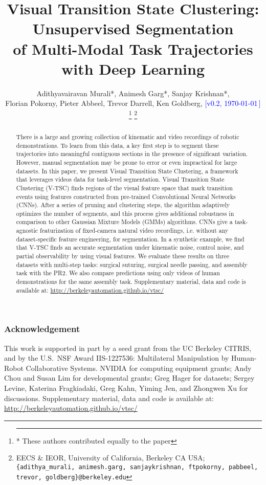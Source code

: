 \documentclass[letterpaper, 10 pt, conference]{ieeeconf}
\title{\LARGE \bf
Visual Transition State Clustering: Unsupervised Segmentation\\ of
Multi-Modal \del{Surgical}Task Trajectories with Deep Learning}
\author{%
Adithyavairavan Murali*, Animesh Garg*, Sanjay Krishnan*,\\ Florian Pokorny,
Pieter Abbeel, Trevor Darrell, Ken Goldberg, {\footnotesize \textcolor{blue}{[v0.2, \today\,\currenttime]}} 
\thanks{\hrule \vspace{5pt} * These authors contributed equally to the paper}%
\thanks{EECS \& IEOR, University of California, Berkeley CA USA; \texttt{\{adithya\_murali, animesh.garg, sanjaykrishnan, ftpokorny, pabbeel, trevor, goldberg\}@berkeley.edu}}%
}
\newcommand{\tsc}{V-TSC\xspace}
\begin{document}
\maketitle

\begin{abstract}
There is a large and growing collection of kinematic and video recordings of robotic demonstrations.
To learn from this data, a key first step is to segment these trajectories into meaningful contiguous sections in the presence of significant variation.  
However, manual segmentation may be prone to error or even impractical for large datasets.
In this paper, we present Visual Transition State Clustering, a framework that leverages videos data for task-level segmentation. Visual Transition State Clustering (\tsc) finds regions of the visual feature space that mark transition events using features constructed from pre-trained Convolutional Neural Networks (CNNs).
After a series of pruning and clustering steps, the algorithm adaptively optimizes the number of segments, and this process gives additional robustness in comparison to other Gaussian Mixture Models (GMMs) algorithms.
CNNs give a task-agnostic featurization of  fixed-camera natural video recordings, i.e. without any dataset-specific feature engineering, for segmentation.
In a synthetic example, we find that \tsc finds an accurate segmentation under kinematic noise, control noise, and partial observability by using visual features. 
We evaluate these results on three datasets with multi-step tasks: surgical suturing, surgical needle passing, and assembly task with the PR2. We also compare predictions using only videos of human demonstrations for the same assembly task.
Supplementary material, data and code is available at: 
\href{http://berkeleyautomation.github.io/vtsc/}{http://berkeleyautomation.github.io/vtsc/}
\end{abstract} 

\fontsize{10pt}{11.5pt}
\selectfont









\subsubsection*{Acknowledgement}
This work is supported in part by a seed grant from the UC Berkeley CITRIS, and by the U.S.\ NSF Award IIS-1227536: Multilateral Manipulation by Human-Robot Collaborative Systems.  NVIDIA for computing equipment grants; Andy Chou and Susan Lim for developmental grants; Greg Hager for datasets; Sergey Levine, Katerina Fragkiadaki, Greg Kahn, Yiming Jen, and Zhongwen Xu for discussions. Supplementary material, data and code is available at: 
\href{http://berkeleyautomation.github.io/vtsc/}{http://berkeleyautomation.github.io/vtsc/}



\end{document}
